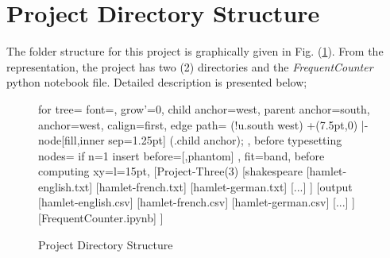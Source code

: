 \documentclass[longpaper, english, final, times]{revdetua}
\begin{document}
	\section{Project Directory Structure}
		The folder structure for this project is graphically given in Fig. (\ref{figure:projectDirectoryStructure}). 
		From the representation, the project has two (2) directories and the \textit{FrequentCounter} python notebook file. Detailed description is presented below;
		\begin{figure}[!ht]
			\begin{center}
				\begin{forest}
					for tree={
						font=\ttfamily,
						grow'=0,
						child anchor=west,
						parent anchor=south,
						anchor=west,
						calign=first,
						edge path={
							\noexpand{}
							(!u.south west) +(7.5pt,0) |- node[fill,inner sep=1.25pt] {} (.child anchor);
						},
						before typesetting nodes={
							if n=1
							{insert before={[,phantom]}}
							{}
						},
						fit=band,
						before computing xy={l=15pt},
					}
					[Project-Three(3)
					[shakespeare
					[hamlet-english.txt]
					[hamlet-french.txt]
					[hamlet-german.txt]
					[...]
					]
					[output
					[hamlet-english.csv]
					[hamlet-french.csv]
					[hamlet-german.csv]
					[...]
					]
					[FrequentCounter.ipynb]
					]
				\end{forest}
			\end{center}
			\caption{Project Directory Structure}
			\label{figure:projectDirectoryStructure}
		\end{figure}
		
\end{document}
